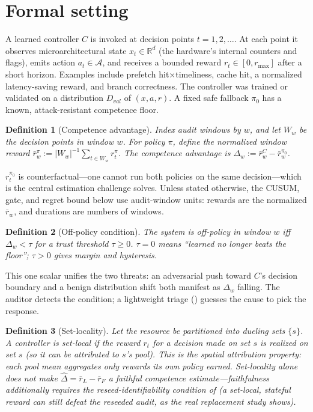 \documentclass{article}
\newtheorem{definition}{Definition}
\newcommand{\dhat}{\hat{\Delta}}
\newcommand{\rmax}{r_{\max}}
\newcommand{\pizero}{\pi_0}
\begin{document}
\section{Formal setting}\label{sec:setting}
A learned controller $C$ is invoked at decision points $t=1,2,\dots$. At each
point it observes microarchitectural state $x_t\in\mathbb{R}^d$ (the hardware's
internal counters and flags), emits action $a_t\in\mathcal{A}$, and receives a
bounded reward $r_t\in[0,\rmax]$ after a short horizon. Examples include prefetch
hit$\times$timeliness, cache hit, a normalized latency-saving reward, and branch
correctness. The controller was trained or validated on a distribution $D_{val}$
of $(x,a,r)$. A fixed safe fallback $\pizero$ has a known, attack-resistant
competence floor.

\begin{definition}[Competence advantage]
Index audit windows by $w$, and let $W_w$ be the decision points in window $w$.
For policy $\pi$, define the normalized window reward
$\bar r_w^\pi:=|W_w|^{-1}\sum_{t\in W_w}r_t^\pi$. The competence advantage is
$\Delta_w:=\bar r_w^C-\bar r_w^{\pizero}$.
\end{definition}
$r_t^{\pizero}$ is counterfactual---one cannot run both policies on the same
decision---which is the central estimation challenge  solves.
Unless stated otherwise, the CUSUM, gate, and regret bound below use audit-window
units: rewards are the normalized $\bar r_w$, and durations are numbers of windows.

\begin{definition}[Off-policy condition]
The system is \emph{off-policy} in window $w$ iff $\Delta_w<\tau$ for a trust threshold
$\tau\ge 0$. $\tau{=}0$ means ``learned no longer beats the floor''; $\tau{>}0$
gives margin and hysteresis.
\end{definition}

This one scalar unifies the two threats: an adversarial push toward $C$'s
decision boundary and a benign distribution shift both manifest as $\Delta_w$ falling.
The auditor detects the condition; a lightweight triage ()
guesses the cause to pick the response.

\begin{definition}[Set-locality]\label{def:setlocal}
Let the resource be partitioned into dueling sets $\{s\}$. A controller is
\emph{set-local} if the reward $r_t$ for a decision made on set $s$ is realized on
set $s$ (so it can be attributed to $s$'s pool). This is the \emph{spatial
attribution} property: each pool mean aggregates only rewards its own policy earned.
Set-locality alone does \emph{not} make $\dhat=\bar r_L-\bar r_F$ a faithful
competence estimate---faithfulness additionally requires the reseed-identifiability
condition of  (a set-local, stateful reward can still defeat the
reseeded audit, as the real replacement study shows).
\end{definition}
\end{document}
